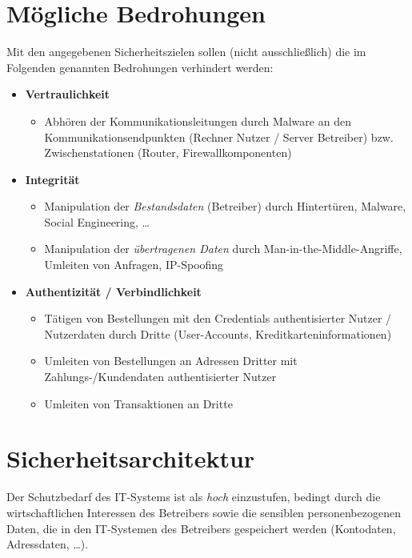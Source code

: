 \section{Mögliche Bedrohungen}

Mit den angegebenen Sicherheitszielen sollen (nicht ausschließlich) die im Folgenden genannten Bedrohungen verhindert werden:

\begin{itemize}
    \itemsep0.5em
    \item \textbf{Vertraulichkeit}
    \begin{itemize}
        \item Abhören der Kommunikationsleitungen durch Malware an den Kommunikationsendpunkten (Rechner Nutzer / Server Betreiber) bzw. Zwischenstationen (Router, Firewallkomponenten)
    \end{itemize}
    \item \textbf{Integrität}
    \begin{itemize}
        \item Manipulation der \textit{Bestandsdaten} (Betreiber) durch Hintertüren, Malware, Social Engineering, \ldots
        \item Manipulation der \textit{übertragenen Daten} durch Man-in-the-Middle-Angriffe, Umleiten von Anfragen, IP-Spoofing
    \end{itemize}
    \item \textbf{Authentizität / Verbindlichkeit}
    \begin{itemize}
        \item Tätigen von Bestellungen mit den Credentials authentisierter Nutzer / Nutzerdaten durch Dritte (User-Accounts, Kreditkarteninformationen)
        \item Umleiten von Bestellungen an Adressen Dritter mit Zahlungs-/Kundendaten authentisierter Nutzer
        \item Umleiten von Transaktionen an Dritte
    \end{itemize}
\end{itemize}

\section{Sicherheitsarchitektur}

Der Schutzbedarf des IT-Systems ist als \textit{hoch} einzustufen, bedingt durch die wirtschaftlichen Interessen des Betreibers sowie die sensiblen personenbezogenen Daten, die in den IT-Systemen des Betreibers gespeichert werden (Kontodaten, Adressdaten, \ldots).\\

